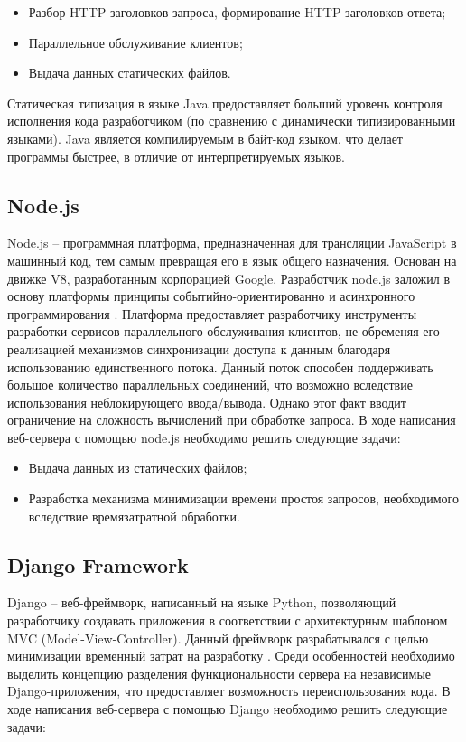\begin{itemize}
	\item Разбор HTTP-заголовков запроса, формирование HTTP-заголовков ответа;
	\item Параллельное обслуживание клиентов;
	\item Выдача данных статических файлов.
\end{itemize}

Статическая типизация в языке Java предоставляет больший уровень контроля исполнения кода разработчиком (по сравнению с динамически типизированными языками). Java является компилируемым в байт-код языком, что делает программы быстрее, в отличие от интерпретируемых языков.

\subsection{Node.js}

Node.js – программная платформа, предназначенная для трансляции JavaScript в машинный код, тем самым превращая его в язык общего назначения. Основан на движке V8, разработанным корпорацией Google. Разработчик node.js заложил в основу платформы принципы событийно-ориентированно и асинхронного программирования \cite{node}. Платформа предоставляет разработчику инструменты разработки сервисов параллельного обслуживания клиентов, не обременяя его реализацией механизмов синхронизации доступа к данным благодаря использованию единственного потока. Данный поток способен поддерживать большое количество параллельных соединений, что возможно вследствие использования неблокирующего ввода/вывода. Однако этот факт вводит ограничение на сложность вычислений при обработке запроса. В ходе написания веб-сервера с помощью node.js необходимо решить следующие задачи:

\begin{itemize}
	\item Выдача данных из статических файлов;
	\item Разработка механизма минимизации времени простоя запросов, необходимого вследствие времязатратной обработки.
\end{itemize}

\subsection{Django Framework}

Django – веб-фреймворк, написанный на языке Python, позволяющий разработчику создавать приложения в соответствии с архитектурным шаблоном MVC (Model-View-Controller). Данный фреймворк разрабатывался с целью минимизации временный затрат на разработку \cite{django}. Среди особенностей необходимо выделить концепцию разделения функциональности сервера на независимые Django-приложения, что предоставляет возможность переиспользования кода. В ходе написания веб-сервера с помощью Django необходимо решить следующие задачи:

